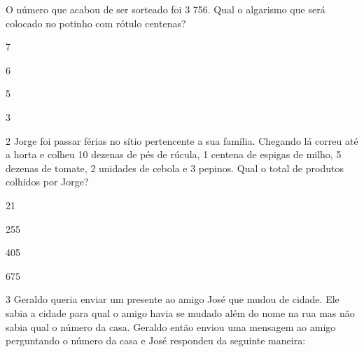 O número que acabou de ser sorteado foi 3 756. Qual o algarismo que será
colocado no potinho com rótulo centenas?

\begin{escolha}
\item
  7
\item
  6
\item
  5
\item
  3
\end{escolha}


\num{2} Jorge foi passar férias no sítio pertencente a sua família.
Chegando lá correu até a horta e colheu 10 dezenas de pés de rúcula, 1
centena de espigas de milho, 5 dezenas de tomate, 2 unidades de cebola e
3 pepinos. Qual o total de produtos colhidos por Jorge?

\begin{escolha}
\item
  21
\item
  255
\item
  405
\item
  675
\end{escolha}


\num{3} Geraldo queria enviar um presente ao amigo José que mudou de
cidade. Ele sabia a cidade para qual o amigo havia se mudado além do
nome na rua mas não sabia qual o número da casa. Geraldo então enviou
uma mensagem ao amigo perguntando o número da casa e José respondeu da
seguinte maneira:

